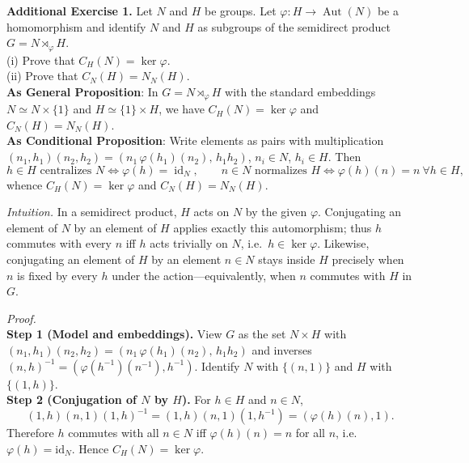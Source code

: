 \documentclass[12pt]{article}
\theoremstyle{definition}
\begin{document}
\newpage

\noindent \textbf{Additional Exercise 1.} Let $N$ and $H$ be groups. Let $\varphi:H\to \operatorname{Aut}(N)$ be a homomorphism and identify $N$ and $H$ as subgroups of the semidirect product $G=N\rtimes_{\varphi} H$.\\
(i) Prove that $C_H(N)=\ker\varphi$.\\
(ii) Prove that $C_N(H)=N_N(H)$.\\ %

\noindent\textbf{As General Proposition}: In $G=N\rtimes_{\varphi} H$ with the standard embeddings $N\simeq N\times\{1\}$ and $H\simeq\{1\}\times H$, we have $C_H(N)=\ker\varphi$ and $C_N(H)=N_N(H)$.\\

\noindent\textbf{As Conditional Proposition}: Write elements as pairs with multiplication $(n_1,h_1)(n_2,h_2)=(n_1\,\varphi(h_1)(n_2),\,h_1h_2)$, $n_i\in N$, $h_i\in H$. Then
\[
h\in H \text{ centralizes } N \iff \varphi(h)=\operatorname{id}_N,\qquad
n\in N \text{ normalizes } H \iff \varphi(h)(n)=n\ \forall h\in H,
\]
whence $C_H(N)=\ker\varphi$ and $C_N(H)=N_N(H)$.\\

\newpage

\dotfill

\emph{Intuition.}
In a semidirect product, $H$ acts on $N$ by the given $\varphi$. Conjugating an element of $N$ by an element of $H$ applies exactly this automorphism; thus $h$ commutes with every $n$ iff $h$ acts trivially on $N$, i.e.\ $h\in\ker\varphi$. Likewise, conjugating an element of $H$ by an element $n\in N$ stays inside $H$ precisely when $n$ is fixed by every $h$ under the action—equivalently, when $n$ commutes with $H$ in $G$.\\

\dotfill

\emph{Proof.}\\
\textbf{Step 1 (Model and embeddings).} View $G$ as the set $N\times H$ with $(n_1,h_1)(n_2,h_2)=(n_1\,\varphi(h_1)(n_2),\,h_1h_2)$ and inverses $(n,h)^{-1}=(\varphi(h^{-1})(n^{-1}),h^{-1})$. Identify $N$ with $\{(n,1)\}$ and $H$ with $\{(1,h)\}$.\\

\textbf{Step 2 (Conjugation of $N$ by $H$).} For $h\in H$ and $n\in N$,
\[
(1,h)(n,1)(1,h)^{-1}
=(1,h)(n,1)(1,h^{-1})
=(\varphi(h)(n),1).
\]
Therefore $h$ commutes with all $n\in N$ iff $\varphi(h)(n)=n$ for all $n$, i.e.\ $\varphi(h)=\mathrm{id}_N$. Hence $C_H(N)=\ker\varphi$.\\
\end{document}
